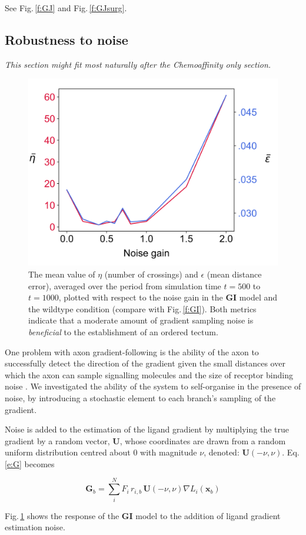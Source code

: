\documentclass[11pt, a4paper]{article}
\begin{document}
See Fig.\,\ref{f:GJ} and Fig.\,\ref{f:GJsurg}.

\subsection*{Robustness to noise}

\emph{This section might fit most naturally after the Chemoaffinity only section.}

\begin{figure}
\includegraphics[width=0.3\linewidth]{./images/GI_vs_noise_tweaked.png}
\caption{The mean value of $\eta$ (number of crossings) and $\epsilon$
(mean distance error), averaged over the period from simulation time $t=500$ to $t=1000$, plotted with respect to the
noise gain in the $\mathbf{GI}$ model and the wildtype condition (compare with
Fig.\,\ref{f:GI}). Both metrics indicate that a moderate
amount of gradient sampling noise is \emph{beneficial} to the establishment of
an ordered tectum.}
\label{f:noise}
\end{figure}

One problem with axon gradient-following is the ability of the axon to
successfully detect the direction of the gradient given the small distances
over which the axon can sample signalling molecules and the size of receptor
binding noise \citep{goodhill_noise_2014}.  We investigated the ability of the
system to self-organise in the presence of noise, by introducing a stochastic
element to each branch's sampling of the gradient.

Noise is added to the estimation of the ligand gradient by multiplying the
true gradient by a random vector, $\mathbf{U}$, whose coordinates are drawn
from a random uniform distribution centred about 0 with magnitude $\nu$, denoted:
$\mathbf{U}(-\nu, \nu)$. Eq.\,\ref{e:G} becomes

\begin{equation}\label{e:Gnu}
\mathbf{G}_b = \sum_i^N F_i\,r_{i,b}\, \mathbf{U}(-\nu, \nu) \nabla L_i(\mathbf{x}_b)
\end{equation}

Fig.\,\ref{f:noise} shows the response of the $\mathbf{GI}$ model to the
addition of ligand gradient estimation noise.
\end{document}
